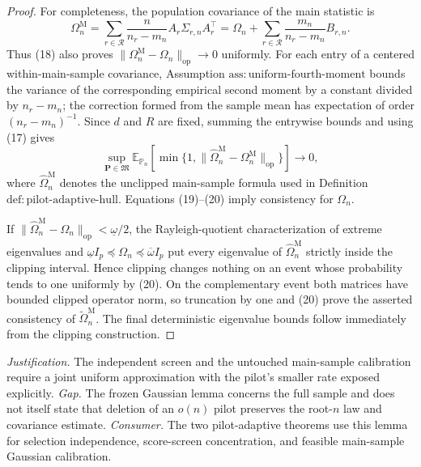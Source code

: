 \documentclass{article}
\begin{document}
\begin{proof}
For completeness, the population covariance of the main statistic is
\[
 \Omega_n^{\mathrm M}
 =\sum_{r\in\mathcal R}\frac n{n_r-m_n}
   A_r\Sigma_{r,n}A_r^{\top}
 =\Omega_n+\sum_{r\in\mathcal R}
   \frac{m_n}{n_r-m_n}B_{r,n}.
\tag{19}
\]
Thus (18) also proves \(\|\Omega_n^{\mathrm M}-\Omega_n\|_{\mathrm{op}}\to0\) uniformly.  For each entry of a centered within-main-sample covariance, Assumption \(\mathrm{ass:uniform\text{-}fourth\text{-}moment}\) bounds the variance of the corresponding empirical second moment by a constant divided by \(n_r-m_n\); the correction formed from the sample mean has expectation of order \((n_r-m_n)^{-1}\).  Since \(d\) and \(R\) are fixed, summing the entrywise bounds and using (17) gives
\[
 \sup_{\mathbf P\in\mathfrak M}
 \mathbb E_{\mathbb P_n}\!\left[
 \min\{1,\|\widehat\Omega_n^{\mathrm M}-\Omega_n^{\mathrm M}\|_{\mathrm{op}}\}
 \right]\longrightarrow0,
\tag{20}
\]
where \(\widehat\Omega_n^{\mathrm M}\) denotes the unclipped main-sample formula used in Definition \(\mathrm{def:pilot\text{-}adaptive\text{-}hull}\).  Equations (19)--(20) imply consistency for \(\Omega_n\).

If \(\|\widehat\Omega_n^{\mathrm M}-\Omega_n\|_{\mathrm{op}}<\underline\omega/2\), the Rayleigh-quotient characterization of extreme eigenvalues and \(\underline\omega I_p\preceq\Omega_n\preceq\overline\omega I_p\) put every eigenvalue of \(\widehat\Omega_n^{\mathrm M}\) strictly inside the clipping interval.  Hence clipping changes nothing on an event whose probability tends to one uniformly by (20).  On the complementary event both matrices have bounded clipped operator norm, so truncation by one and (20) prove the asserted consistency of \(\widetilde\Omega_n^{\mathrm M}\).  The final deterministic eigenvalue bounds follow immediately from the clipping construction.
\end{proof}
\par\smallskip\noindent \textit{Justification.} The independent screen and the untouched main-sample calibration require a joint uniform approximation with the pilot's smaller rate exposed explicitly. \textit{Gap.} The frozen Gaussian lemma concerns the full sample and does not itself state that deletion of an \(o(n)\) pilot preserves the root-\(n\) law and covariance estimate. \textit{Consumer.} The two pilot-adaptive theorems use this lemma for selection independence, score-screen concentration, and feasible main-sample Gaussian calibration.
\end{document}
